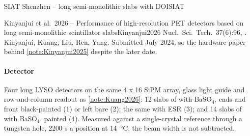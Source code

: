 \begin{programnote}{SIAT Shenzhen -- long semi-monolithic slabs with DOI}{SIAT}
\begin{papernote}{Kinyanjui et al.\ 2026 -- Performance of high-resolution PET detectors based on long semi-monolithic scintillator slabs}{Kinyanjui2026}
Nucl.\ Sci.\ Tech.\ 37(6):96, . Kinyanjui,
Kuang, Liu, Ren, Yang. Submitted July 2024, so the hardware paper behind
\ref{note:Kinyanjui2025} despite the later date.

\paragraph{Detector}
Four long LYSO detectors on the same 4 x 16 SiPM array,  glass light
guide and row-and-column readout as \ref{note:Kuang2026}: 12 slabs of
 with BaSO$_4$, ends and front black-painted
(1) or left bare (2); the same with ESR (3); and 14 slabs of
 with BaSO$_4$, painted (4). Measured against
a single-crystal reference through a  tungsten hole, 2200 s a position
at \qty{14}{\celsius}; the  beam width is not subtracted.


\end{papernote}
\end{programnote}
